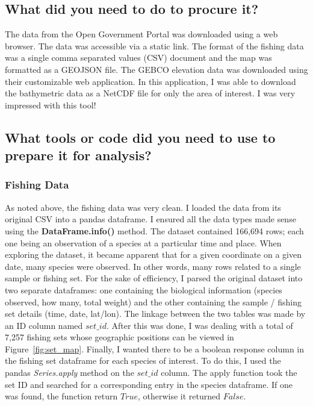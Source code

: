 \subsection{What did you need to do to procure it?}

The data from the Open Government Portal was downloaded using a web browser.
The data was accessible via a static link.
The format of the fishing data was a single comma separated values (CSV) document and the map was formatted as a GEOJSON file.
The GEBCO elevation data was downloaded using their customizable web application.
In this application, I was able to download the bathymetric data as a NetCDF file for only the area of interest.
I was very impressed with this tool!

\subsection{What tools or code did you need to use to prepare it for analysis?}

\subsubsection{Fishing Data}

As noted above, the fishing data was very clean.
I loaded the data from its original CSV into a pandas dataframe.
I ensured all the data types made sense using the \textbf{DataFrame.info()} method.
The dataset contained 166,694 rows; each one being an observation of a species at a particular time and place.
When exploring the dataset, it became apparent that for a given coordinate on a given date, many species were observed.
In other words, many rows related to a single sample or fishing set.
For the sake of efficiency, I parsed the original dataset into two separate dataframes:
one containing the biological information (species observed, how many, total weight)
and the other containing the sample / fishing set details (time, date, lat/lon).
The linkage between the two tables was made by an ID column named $set\_id$.
After this was done, I was dealing with a total of 7,257 fishing sets whose geographic positions can be viewed in Figure~\ref{fig:set_map}.
Finally, I wanted there to be a boolean response column in the fishing set dataframe for each species of interest.
To do this, I used the pandas \textit{Series.apply} method on the $set\_id$ column.
The apply function took the set ID and searched for a corresponding entry in the species dataframe.
If one was found, the function return $True$, otherwise it returned $False$.

